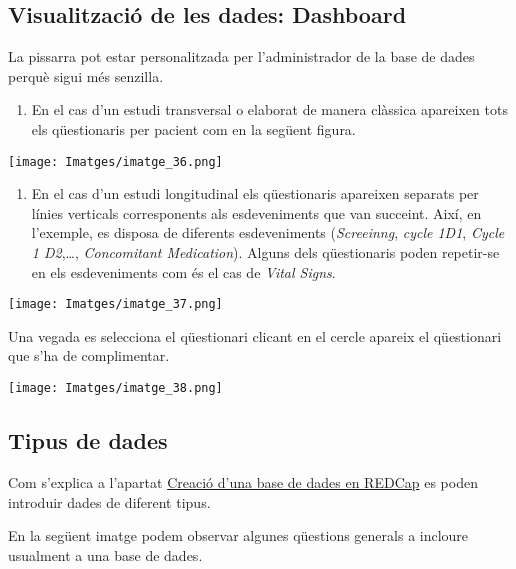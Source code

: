 \documentclass[
]{article}
\providecommand{\tightlist}{%
  \setlength{\itemsep}{0pt}\setlength{\parskip}{0pt}}
\begin{document}
\hypertarget{visualitzaciuxf3-de-les-dades-dashboard}{%
\subsection{\texorpdfstring{\textbf{Visualització de les dades: Dashboard}}{Visualització de les dades: Dashboard}}\label{visualitzaciuxf3-de-les-dades-dashboard}}

La pissarra pot estar personalitzada per l'administrador de la base de dades perquè sigui més senzilla.

\begin{enumerate}
\def\labelenumi{\arabic{enumi}.}
\tightlist
\item
  En el cas d'un estudi transversal o elaborat de manera clàssica apareixen tots els qüestionaris per pacient com en la següent figura.
\end{enumerate}

\texttt{[image: Imatges/imatge\_36.png]}

\begin{enumerate}
\def\labelenumi{\arabic{enumi}.}
\setcounter{enumi}{1}
\tightlist
\item
  En el cas d'un estudi longitudinal els qüestionaris apareixen separats per línies verticals corresponents als esdeveniments que van succeint. Així, en l'exemple, es disposa de diferents esdeveniments (\emph{Screeinng}, \emph{cycle 1D1}, \emph{Cycle 1 D2},\ldots, \emph{Concomitant Medication}). Alguns dels qüestionaris poden repetir-se en els esdeveniments com és el cas de \emph{Vital Signs}.
\end{enumerate}

\texttt{[image: Imatges/imatge\_37.png]}

Una vegada es selecciona el qüestionari clicant en el cercle apareix el qüestionari que s'ha de complimentar.

\texttt{[image: Imatges/imatge\_38.png]}

\hypertarget{tipus-de-dades}{%
\subsection{\texorpdfstring{\textbf{Tipus de dades}}{Tipus de dades}}\label{tipus-de-dades}}

Com s'explica a l'apartat \protect\hyperlink{en15}{Creació d'una base de dades en REDCap} es poden introduir dades de diferent tipus.

En la següent imatge podem observar algunes qüestions generals a incloure usualment a una base de dades.
\end{document}
